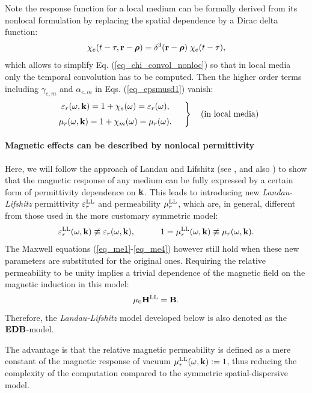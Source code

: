 Note the response function for a local medium can be formally derived from its nonlocal formulation by replacing the spatial dependence by a Dirac delta function: %
\begin{equation} \chi_e(t-\tau, {\mathbf{r}}-\boldsymbol{\rho}) = \delta^{3}({\mathbf{r}}-\boldsymbol{\rho}) \; \chi_e(t-\tau), \label{eq_loc_chi}\end{equation}
which allows to simplify Eq. (\ref{eq_chi_convol_nonloc}) so that in local media only the temporal convolution has to be computed. Then the higher order terms including $\gamma_{e,m}$ and $\alpha_{e,m}$ in Eqs. (\ref{eq_epsmusd1}) vanish:
\begin{equation} 
\left.  \begin{array}{c}
\epsrn(\omega,\kk) = 1 + \chi_e(\omega) = \epsrl(\omega), \medskip \\
\murn(\omega,\kk) = 1 + \chi_m(\omega) = \murl(\omega). 
\end{array} \quad \right\} \quad \text{(in local media)}
\label{eq_epsmusd2}\end{equation}

\paragraph{Magnetic effects can be described by nonlocal permittivity} %
Here, we will follow the approach of Landau and Lifshitz (see \cite{landau1984electrodynamics}, and also \cite{krowne2007book_agran, agranovich2006spatial}) to show that the magnetic response of any medium can be fully expressed by a certain form of permittivity dependence on ${\mathbf{k}}$. This leads to introducing new \textit{Landau-Lifshitz} permittivity $\varepsilon_r^\text{LL}$ and permeability $\mu_r^\text{LL}$, which are, in general, different from those used in the more customary symmetric model:
$$\varepsilon_r^\text{LL}(\omega, {\mathbf{k}}) \not\equiv \varepsilon_r(\omega, {\mathbf{k}}),\quad\quad\quad 1 = \mu_r^\text{LL}(\omega, {\mathbf{k}}) \not\equiv \mu_r(\omega, {\mathbf{k}}).$$
The Maxwell equations (\ref{eq_me1}-\ref{eq_me4}) however still hold when these new parameters are substituted for the original ones. Requiring the relative permeability to be unity implies a trivial dependence of the magnetic field on the magnetic induction in this model:
$$ \mu_0 {\mathbf{H}^\text{LL}} = \mathbf{B}. $$
Therefore, the \textit{Landau-Lifshitz} model developed below is also denoted as the $\mathbf{E}\mathbf{D}\mathbf{B}$-model.

The advantage is that the relative magnetic permeability is defined as a mere constant of the magnetic response of vacuum $\mu_r^\text{LL}(\omega, {\mathbf{k}}) := 1$, thus reducing the complexity of the computation compared to the symmetric spatial-dispersive model. %

